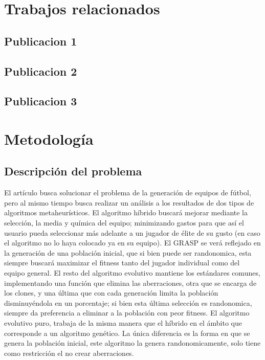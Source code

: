 \documentclass[11pt, twocolumn]{article}
\begin{document}
\section{Trabajos relacionados}
\subsection{Publicacion 1}
\subsection{Publicacion 2}
\subsection{Publicacion 3}

\section{Metodología}
\subsection{Descripción del problema}
El artículo busca solucionar el problema de la generación de equipos de fútbol, pero al mismo tiempo busca realizar un análisis a los resultados de dos tipos de algoritmos metaheurísticos.\newline
El algoritmo híbrido buscará mejorar mediante la selección, la media y química del equipo; minimizando gastos para que así el usuario pueda seleccionar más adelante a un jugador de élite de su gusto (en caso el algoritmo no lo haya colocado ya en su equipo). El GRASP se verá reflejado en la generación de una población inicial, que si bien puede ser randonomica, esta siempre buscará maximizar el fitness tanto del jugador individual como del equipo general. El resto del algoritmo evolutivo mantiene los estándares comunes, implementando una función que elimina las aberraciones, otra que se encarga de los clones, y una última que con cada generación limita la población disminuyéndola en un porcentaje; si bien esta última selección es randonomica, siempre da preferencia a eliminar a la población con peor fitness. \newline
El algoritmo evolutivo puro, trabaja de la misma manera que el híbrido en el ámbito que corresponde a un algoritmo genético. La única diferencia es la forma en que se genera la población inicial, este algoritmo la genera randonomicamente, solo tiene como restricción el no crear aberraciones.
\end{document}
